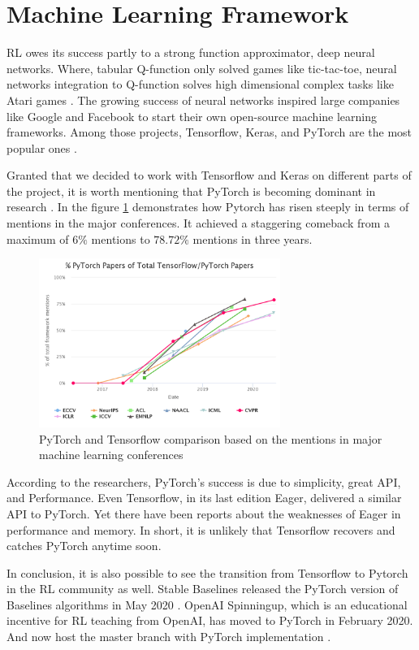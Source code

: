 \section{Machine Learning Framework}


RL owes its success partly to a strong function approximator, deep neural networks. Where, tabular Q-function only solved games like tic-tac-toe, neural networks integration to Q-function solves high dimensional complex tasks like Atari games \cite{Mnih}. The growing success of neural networks inspired large companies like Google and Facebook to start their own open-source machine learning frameworks. Among those projects, Tensorflow, Keras, and PyTorch are the most popular ones \cite{Tensoflow} \cite{Keras} \cite{PyTorch}. 

Granted that we decided to work with Tensorflow and Keras on different parts of the project, it is worth mentioning that PyTorch is becoming dominant in research \cite{Horace}. In the figure \ref{fig:ptvstf} demonstrates how Pytorch has risen steeply in terms of mentions in the major conferences. It achieved a staggering comeback from a maximum of \(6\%\) mentions to \(78.72\%\) mentions in three years.  

\begin{figure}[htbp] 
    \centering
    \includegraphics[width=0.7\textwidth]{figures/tfvspytorch}
    \caption{PyTorch and Tensorflow comparison based on the mentions in major machine learning conferences \cite{Horace}}
    \label{fig:ptvstf}
\end{figure}


According to the researchers, PyTorch’s success is due to simplicity, great API, and Performance. Even Tensorflow, in its last edition Eager, delivered a similar API to PyTorch. Yet there have been reports about the weaknesses of Eager in performance and memory. In short, it is unlikely that Tensorflow recovers and catches PyTorch anytime soon.

In conclusion, it is also possible to see the transition from Tensorflow to Pytorch in the RL community as well. Stable Baselines released the PyTorch version of Baselines algorithms in May 2020 \cite{stable-baselines3}. OpenAI Spinningup, which is an educational incentive for RL teaching from OpenAI, has moved to PyTorch in February 2020. And now host the master branch with PyTorch implementation \cite{SpinningUp2018}.

 